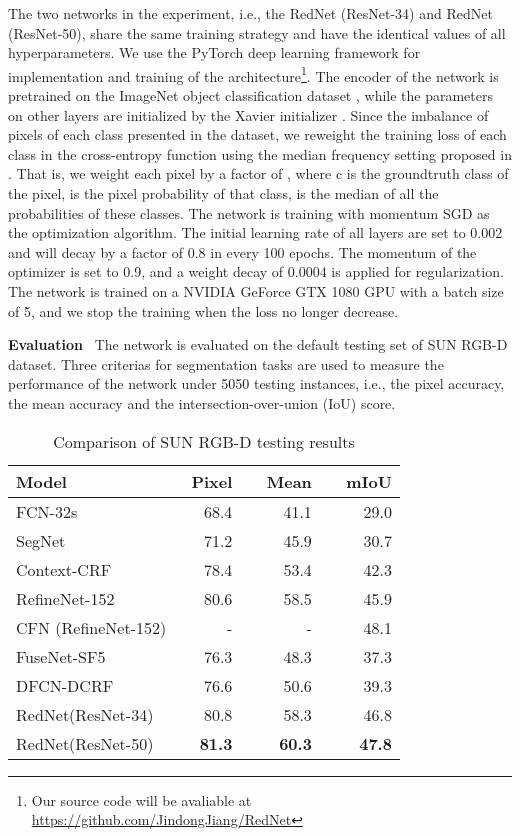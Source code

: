 \documentclass[runningheads]{llncs}
\begin{document}
The two networks in the experiment, i.e., the RedNet (ResNet-34) and RedNet (ResNet-50), share the same training strategy and have the identical values of all hyperparameters. We use the PyTorch deep learning framework \cite{paszke2017automatic} for implementation and training of the architecture\footnote{Our source code will be avaliable at \url{https://github.com/JindongJiang/RedNet}}. The encoder of the network is pretrained on the ImageNet object classification dataset \cite{krizhevsky2012imagenet}, while the parameters on other layers are initialized by the Xavier initializer \cite{glorot2010understanding}. Since the imbalance of pixels of each class presented in the dataset, we reweight the training loss of each class in the cross-entropy function using the median frequency setting proposed in \cite{eigen2015predicting}. That is, we weight each pixel by a factor of , where c is the groundtruth class of the pixel,  is the pixel probability of that class,  is the median of all the probabilities of these classes. The network is training with momentum SGD as the optimization algorithm. The initial learning rate of all layers are set to 0.002 and will decay by a factor of 0.8 in every 100 epochs. The momentum of the optimizer is set to 0.9, and a weight decay of 0.0004 is applied for regularization. The network is trained on a NVIDIA GeForce GTX 1080 GPU with a batch size of 5, and we stop the training when the loss no longer decrease.

\textbf{Evaluation}~ The network is evaluated on the default testing set of SUN RGB-D dataset. Three criterias for segmentation tasks are used to measure the performance of the network under 5050 testing instances, i.e., the pixel accuracy, the mean accuracy and the intersection-over-union (IoU) score.

\begin{table}[t]
    \small
    \caption{Comparison of SUN RGB-D testing results}
    \label{tab:testing_result}
    \centering
    \begin{tabular}{ l r r r }
        \toprule
        Model                    &~Pixel &~~Mean &~~mIoU     \\
        \midrule
FCN-32s \cite{long2015fully} &68.4 &41.1 &29.0           \\
SegNet \cite{badrinarayanan2015segnet} &71.2 &45.9 &30.7              \\
        Context-CRF \cite{lin2016exploring} &78.4 &53.4 &42.3             \\
        RefineNet-152 \cite{lin2017refinenet} &80.6 &58.5 &45.9           \\
        CFN (RefineNet-152) \cite{lin2017cascaded} &- &- &48.1    \\
FuseNet-SF5 \cite{hazirbas2016fusenet} &76.3 &48.3 &37.3 \\
        DFCN-DCRF \cite{jiang2017incorporating} &76.6 &50.6 &39.3 \\
        \midrule
RedNet(ResNet-34)                  &80.8 &58.3 &46.8  \\
RedNet(ResNet-50)                  &\textbf{81.3} &\textbf{60.3} &\textbf{47.8} \\
        \bottomrule
    \end{tabular}
\end{table}
\end{document}
